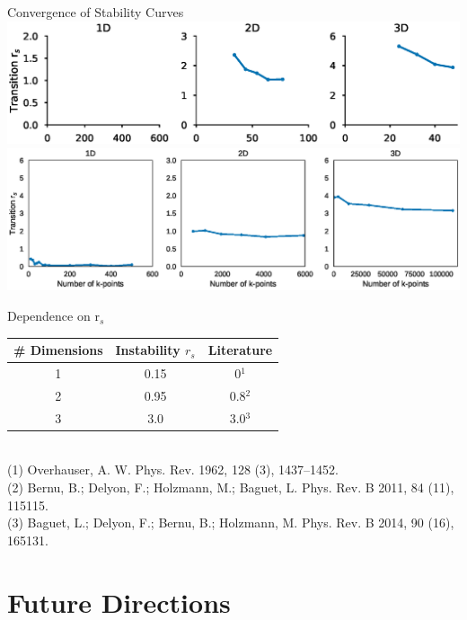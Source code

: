 \documentclass[10pt]{beamer}
\begin{document}
{{{{{{{{{\begin{frame}{Convergence of Stability Curves}
	\includegraphics[width=.95\linewidth]{../figures/singlet_onset.eps}
	\\
	\includegraphics[width=.95\linewidth]{../figures/triplet_onset.eps}
\end{frame}



{%
\begin{frame}{Dependence on r${}_s$}
  \centering
  \begin{tabular}{ c | c | c } 
  \# Dimensions & Instability $r_s$ & Literature \\
  \hline
  1 & 0.15 & 0$^1$ \\ 
  2 & 0.95  & 0.8$^2$ \\ 
  3 & 3.0  & 3.0$^3$ \\ 
  \end{tabular}\\
  \vspace{5mm}
  \tiny
  (1) Overhauser, A. W. Phys. Rev. 1962, 128 (3), 1437–1452. \\
  (2) Bernu, B.; Delyon, F.; Holzmann, M.; Baguet, L. Phys. Rev. B 2011, 84 (11), 115115.\\
  (3) Baguet, L.; Delyon, F.; Bernu, B.; Holzmann, M. Phys. Rev. B 2014, 90 (16), 165131.
\end{frame}

\section{Future Directions}

}}}}}}}}}}
\end{document}
